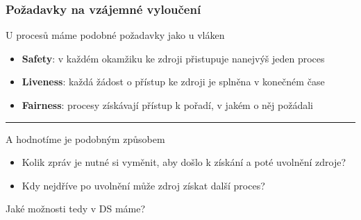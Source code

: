 \documentclass[usenames,dvipsnames,9pt]{beamer}
\begin{document}
\begin{frame}

\frametitle{Požadavky na vzájemné vyloučení}

U procesů máme podobné požadavky jako u vláken

  \begin{itemize}
    \pause\item {\bf Safety}: v každém okamžiku ke zdroji přistupuje nanejvýš jeden proces
    \pause\item {\bf Liveness}: každá žádost o přístup ke zdroji je splněna v konečném čase
    \pause\item {\bf \textcolor{BrickRed}{Fairness}}: procesy získávají přístup k pořadí, v jakém o něj požádali
  \end{itemize}

    \vspace{1em}\hrule\vspace{1em}

    A hodnotíme je podobným způsobem

      \begin{itemize}
    \pause\item Kolik zpráv je nutné si vyměnit, aby došlo k získání a poté uvolnění zdroje?
    \pause\item Kdy nejdříve po uvolnění může zdroj získat další proces?
  \end{itemize}


\end{frame}


\begin{frame}

    \begin{center}
    \LARGE Jaké možnosti tedy v DS máme?
  \end{center}


\end{frame}
\end{document}
